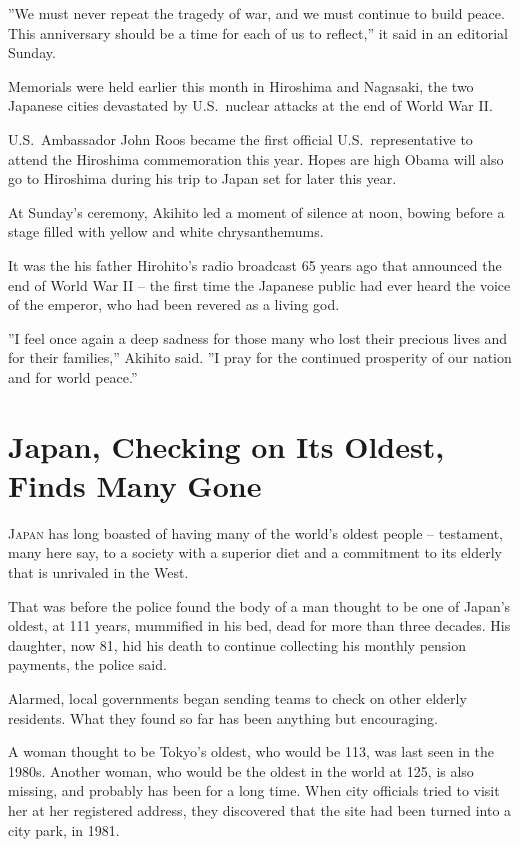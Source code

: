 ﻿\documentclass[12pt]{article}
\begin{document}
''We must never repeat the tragedy of war, and we must continue to build peace. This anniversary
should be a time for each of us to reflect,'' it said in an editorial Sunday.

Memorials were held earlier this month in Hiroshima and Nagasaki, the two Japanese cities devastated
by U.S.~nuclear attacks at the end of World War II.

U.S.~Ambassador John Roos became the first official U.S.~representative to attend the Hiroshima
commemoration this year. Hopes are high Obama will also go to Hiroshima during his trip to Japan set
for later this year.

At Sunday's ceremony, Akihito led a moment of silence at noon, bowing before a stage filled with
yellow and white chrysanthemums.

It was the his father Hirohito's radio broadcast 65 years ago that announced the end of World War II
-- the first time the Japanese public had ever heard the voice of the emperor, who had been revered
as a living god.

''I feel once again a deep sadness for those many who lost their precious lives and for their
families,'' Akihito said. ''I pray for the continued prosperity of our nation and for world peace.''

\section{Japan, Checking on Its Oldest, Finds Many Gone}

\lettrine{J}{apan} has long boasted of having many of the world's oldest
people -- testament, many here say, to a society with a superior diet and a commitment to its
elderly that is unrivaled in the West.

That was before the police found the body of a man thought to be one of Japan's oldest, at 111
years, mummified in his bed, dead for more than three decades. His daughter, now 81, hid his death
to continue collecting his monthly pension payments, the police said.

Alarmed, local governments began sending teams to check on other elderly residents. What they found
so far has been anything but encouraging.

A woman thought to be Tokyo's oldest, who would be 113, was last seen in the 1980s. Another woman,
who would be the oldest in the world at 125, is also missing, and probably has been for a long time.
When city officials tried to visit her at her registered address, they discovered that the site had
been turned into a city park, in 1981.
\end{document}
